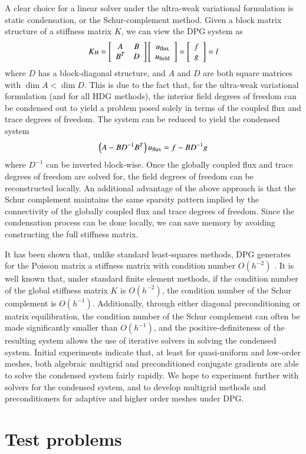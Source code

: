 A clear choice for a linear solver under the ultra-weak variational formulation is static condensation, or the Schur-complement method. Given a block matrix structure of a stiffness matrix $K$, we can view the DPG system as
\[
Ku = \arr{A}{B}{B^T}{D}\vecttwo{u_{\rm flux}}{u_{\rm field}} = \vecttwo{f}{g} = l
\]
where $D$ has a block-diagonal structure, and $A$ and $D$ are both square matrices with $\dim{A} < \dim{D}$. This is due to the fact that, for the ultra-weak variational formulation (and for all HDG methods), the interior field degrees of freedom can be condensed out to yield a problem posed solely in terms of the coupled flux and trace degrees of freedom.  The system can be reduced to yield the condensed system
\[
\left(A-B D^{-1} B^T\right)u_{\rm flux} = f - B D^{-1} g
\]
where $D^{-1}$ can be inverted block-wise. Once the globally coupled flux and trace degrees of freedom are solved for, the field degrees of freedom can be reconstructed locally. An additional advantage of the above approach is that the Schur complement maintains the same sparsity pattern implied by the connectivity of the globally coupled flux and trace degrees of freedom.  Since the condensation process can be done locally, we can save memory by avoiding constructing the full stiffness matrix.

It has been shown that, unlike standard least-squares methods, DPG generates for the Poisson matrix a stiffness matrix with condition number $O(h^{-2})$ \cite{practicalDPG}. It is well known that, under standard finite element methods, if the condition number of the global stiffness matrix $K$ is $O(h^{-2})$, the condition number of the Schur complement is $O(h^{-1})$. Additionally, through either diagonal preconditioning or matrix equilibration, the condition number of the Schur complement can often be made significantly smaller than $O(h^{-1})$, and the positive-definiteness of the resulting system allows the use of iterative solvers in solving the condensed system.  Initial experiments indicate that, at least for quasi-uniform and low-order meshes, both algebraic multigrid and preconditioned conjugate gradients are able to solve the condensed system fairly rapidly.  We hope to experiment further with solvers for the condensed system, and to develop multigrid methods and preconditioners for adaptive and higher order meshes under DPG.  

\section{Test problems}


